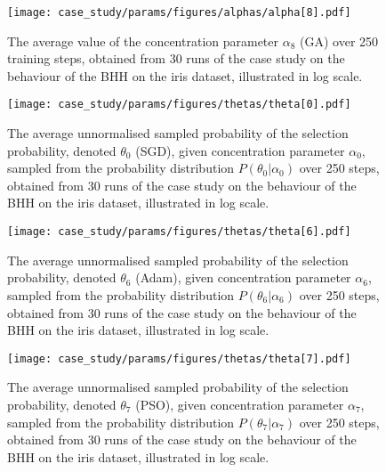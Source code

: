 \begin{figure}[htpb]
	\centering
	\texttt{[image: case\_study/params/figures/alphas/alpha[8].pdf]}
	\caption{The average value of the concentration parameter $\alpha_{8}$ (\acs{GA}) over 250 training steps, obtained from 30 runs of the case study on the behaviour of the \acs{BHH} on the iris dataset, illustrated in log scale.}
	\label{fig:results:case_study:alpha:8}
\end{figure}




\begin{figure}[htpb]
	\centering
	\texttt{[image: case\_study/params/figures/thetas/theta[0].pdf]}
	\caption{The average unnormalised sampled probability of the selection probability, denoted $\theta_{0}$ (\acs{SGD}), given concentration parameter $\alpha_{0}$, sampled from the probability distribution $P(\theta_{0} \vert \alpha_{0})$ over 250 steps, obtained from 30 runs of the case study on the behaviour of the \acs{BHH} on the iris dataset, illustrated in log scale.}
	\label{fig:results:case_study:theta:0}
\end{figure}

\begin{figure}[htpb]
	\centering
	\texttt{[image: case\_study/params/figures/thetas/theta[6].pdf]}
	\caption{The average unnormalised sampled probability of the selection probability, denoted $\theta_{6}$ (\acs{Adam}), given concentration parameter $\alpha_{6}$, sampled from the probability distribution $P(\theta_{6} \vert \alpha_{6})$ over 250 steps, obtained from 30 runs of the case study on the behaviour of the \acs{BHH} on the iris dataset, illustrated in log scale.}
	\label{fig:results:case_study:theta:6}
\end{figure}

\begin{figure}[htpb]
	\centering
	\texttt{[image: case\_study/params/figures/thetas/theta[7].pdf]}
	\caption{The average unnormalised sampled probability of the selection probability, denoted $\theta_{7}$ (\acs{PSO}), given concentration parameter $\alpha_{7}$, sampled from the probability distribution $P(\theta_{7} \vert \alpha_{7})$ over 250 steps, obtained from 30 runs of the case study on the behaviour of the \acs{BHH} on the iris dataset, illustrated in log scale.}
	\label{fig:results:case_study:theta:7}
\end{figure}

